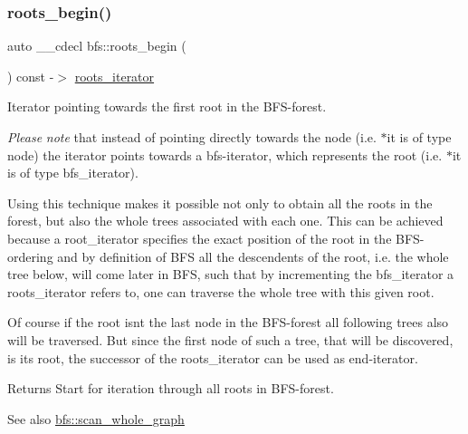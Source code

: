 \subsubsection{\texorpdfstring{roots\+\_\+begin()}{roots\_begin()}}
{\footnotesize\ttfamily auto \+\_\+\+\_\+cdecl bfs\+::roots\+\_\+begin (\begin{DoxyParamCaption}{ }\end{DoxyParamCaption}) const -\/$>$ \mbox{\hyperlink{classbfs_a386ac6f3c63e38c3f5263e15c3ab9d01}{roots\+\_\+iterator}}
	\hspace{0.3cm}{\ttfamily [inline]}}



Iterator pointing towards the first root in the B\+F\+S-\/forest. 

{\itshape Please} {\itshape note} that instead of pointing directly towards the node (i.\+e. {\ttfamily $\ast$it} is of type {\ttfamily node}) the iterator points towards a bfs-\/iterator, which represents the root (i.\+e. {\ttfamily $\ast$it} is of type {\ttfamily bfs\+\_\+iterator}).

Using this technique makes it possible not only to obtain all the roots in the forest, but also the whole trees associated with each one. This can be achieved because a {\ttfamily root\+\_\+iterator} specifies the exact position of the root in the B\+F\+S-\/ordering and by definition of B\+FS all the descendents of the root, i.\+e. the whole tree below, will come later in B\+FS, such that by incrementing the {\ttfamily bfs\+\_\+iterator} a {\ttfamily roots\+\_\+iterator} refers to, one can traverse the whole tree with this given root.

Of course if the root isn\textquotesingle{}t the last node in the B\+F\+S-\/forest all following trees also will be traversed. But since the first node of such a tree, that will be discovered, is its root, the successor of the {\ttfamily roots\+\_\+iterator} can be used as end-\/iterator.

\begin{DoxyReturn}{Returns}
Start for iteration through all roots in B\+F\+S-\/forest. 
\end{DoxyReturn}
\begin{DoxySeeAlso}{See also}
\mbox{\hyperlink{classbfs_ac58d930764e6aa859fe706b1d916b9ad}{bfs\+::scan\+\_\+whole\+\_\+graph}} 
\end{DoxySeeAlso}
\mbox{\label{classbfs_ab120a4a529a9cbf407e5dcba8d33598e}} 
